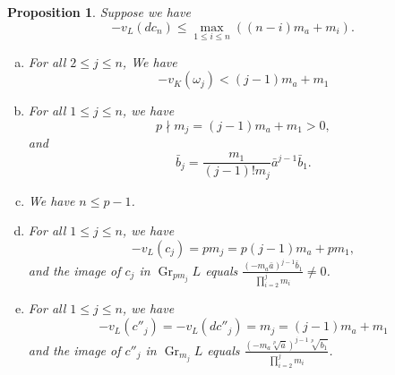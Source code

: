 \documentclass[sn-mathphys-num]{sn-jnl}
\numberwithin{equation}{section}
\newcommand{\Gr}{\operatorname{Gr}}
\theoremstyle{plain}
\newtheorem{prop}[theo]{Proposition}
\theoremstyle{definition}
\begin{document}
\begin{prop}\label{lae}
  Suppose we have
  \begin{equation}\label{et}
  -v_L(dc_n)\leq \max_{1\leq i\leq n}((n-i)m_a+m_{i}).
  \end{equation}
  \begin{enumerate}[(a)]
    \item\label{lae-1} For all $2\leq j\leq n$, We have
  \begin{equation}\label{aee}
    -v_K(\omega_j)<(j-1)m_a+m_1
  \end{equation}
\item\label{lae-2} For all $1\leq j\leq n$, we have
  \begin{equation}\label{ei}
  p\nmid m_j=(j-1)m_a+m_1>0,
\end{equation}
and
\begin{equation}\label{eq}
\bar{b}_j=\frac{m_1}{(j-1)!m_j}\bar{a}^{j-1}\bar{b}_1.
\end{equation}
\item\label{lae-5} We have $n\leq p-1$.
\item\label{lae-3} For all $1\leq j\leq n$, we have
  \begin{equation}\label{er}
  -v_L(c_j)=pm_j=p(j-1)m_a+pm_1,
  \end{equation}
  and the image of $c_j$ in $\Gr_{pm_j}L$ equals $\displaystyle{\frac{(-m_a\bar{a})^{j-1}\bar{b}_1}{\prod_{i=2}^jm_i}\neq 0}$.
\item\label{lae-4}
  For all $1\leq j\leq n$, we have
  \begin{equation}\label{es}
  -v_L(c''_j)=-v_L(dc''_j)=m_j=(j-1)m_a+m_1
  \end{equation}
  and the image of $c''_j$ in $\Gr_{m_j}L$ equals $\displaystyle{\frac{\left(-m_a\sqrt[p]{\bar{a}}\right)^{j-1}\sqrt[p]{\bar{b}_1}}{\prod_{i=2}^jm_i}}$.
  \end{enumerate}
\end{prop}
\end{document}
